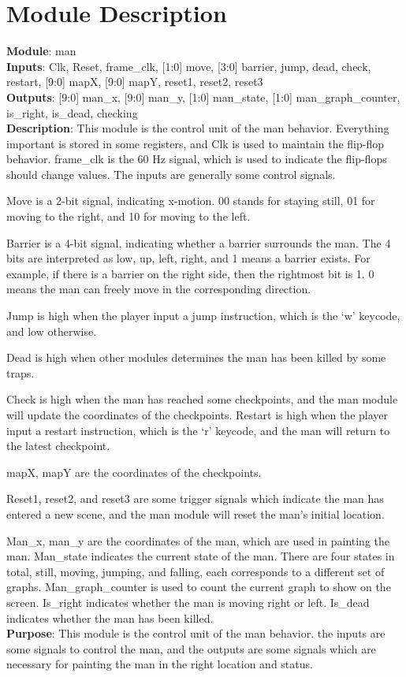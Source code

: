 \documentclass[12pt]{article}
\begin{document}
\section{Module Description}
\textbf{Module}: man \\ 
\textbf{Inputs}: Clk, Reset, frame\_clk, [1:0] move, [3:0] barrier, jump, dead, check, restart, [9:0] mapX, [9:0] mapY, reset1, reset2, reset3 \\ 
\textbf{Outputs}: [9:0] man\_x, [9:0] man\_y, [1:0] man\_state, [1:0] man\_graph\_counter, is\_right, is\_dead, checking \\
\textbf{Description}: This module is the control unit of the man behavior. Everything important is stored in some registers, and Clk is used to maintain the flip-flop behavior. frame\_clk is the 60 Hz signal, which is used to indicate the flip-flops should change values. The inputs are generally some control signals. 

Move is a 2-bit signal, indicating x-motion. 00 stands for staying still, 01 for moving to the right, and 10 for moving to the left.

Barrier is a 4-bit signal, indicating whether a barrier surrounds the man. The 4 bits are interpreted as low, up, left, right, and 1 means a barrier exists. For example, if there is a barrier on the right side, then the rightmost bit is 1. 0 means the man can freely move in the corresponding direction. 

Jump is high when the player input a jump instruction, which is the ‘w’ keycode, and low otherwise. 

Dead is high when other modules determines the man has been killed by some traps. 

Check is high when the man has reached some checkpoints, and the man module will update the coordinates of the checkpoints.
Restart is high when the player input a restart instruction, which is the ‘r’ keycode, and the man will return to the latest checkpoint. 

mapX, mapY are the coordinates of the checkpoints. 

Reset1, reset2, and reset3 are some trigger signals which indicate the man has entered a new scene, and the man module will reset the man’s initial location.

Man\_x, man\_y are the coordinates of the man, which are used in painting the man. Man\_state indicates the current state of the man. There are four states in total, still, moving, jumping, and falling, each corresponds to a different set of graphs. Man\_graph\_counter is used to count the current graph to show on the screen. Is\_right indicates whether the man is moving right or left. Is\_dead indicates whether the man has been killed. \\ 
\textbf{Purpose}: This module is the control unit of the man behavior. the inputs are some signals to control the man, and the outputs are some signals which are necessary for painting the man in the right location and status. \\
\end{document}
